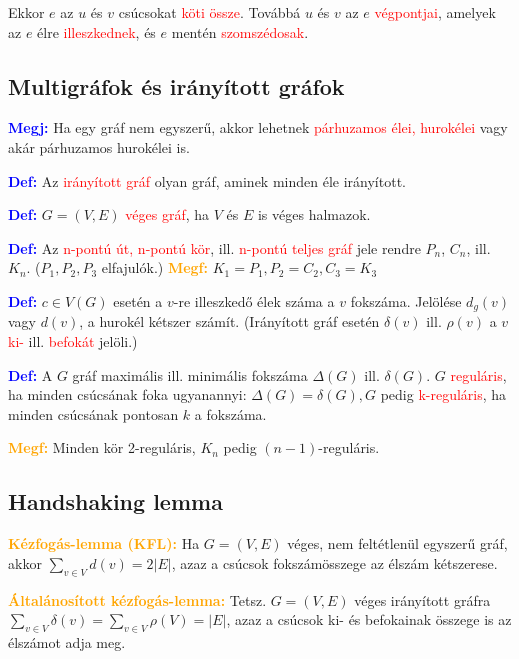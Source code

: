 \documentclass[12pt]{article}
\begin{document}
			Ekkor $e$ az $u$ és $v$ csúcsokat \textcolor{red}{köti össze}. Továbbá $u$ és $v$ az $e$ \textcolor{red}{végpontjai}, amelyek az $e$ élre \textcolor{red}{illeszkednek}, és $e$ mentén \textcolor{red}{szomszédosak}.
		
		\subsection{Multigráfok és irányított gráfok}

			\textcolor{blue}{\textbf{Megj:}} Ha egy gráf nem egyszerű, akkor lehetnek \textcolor{red}{párhuzamos élei, hurokélei} vagy akár párhuzamos hurokélei is.
			
			\textcolor{blue}{\textbf{Def:}} Az \textcolor{red}{irányított gráf} olyan gráf, aminek minden éle irányított.

			\textcolor{blue}{\textbf{Def:}} $G = (V,E)$ \textcolor{red}{véges gráf}, ha $V$ és $E$ is véges halmazok.

			\textcolor{blue}{\textbf{Def:}} Az \textcolor{red}{n-pontú út, n-pontú kör}, ill. \textcolor{red}{n-pontú teljes gráf} jele rendre $P_n$, $C_n$, ill. $K_n$. ($P_1,P_2,P_3$ elfajulók.) \textcolor{orange}{\textbf{Megf:}} $K_1 = P_1, P_2=C_2, C_3=K_3$

			\textcolor{blue}{\textbf{Def:}} $c \in V(G)$ esetén a $v$-re illeszkedő élek száma a $v$ fokszáma. Jelölése $d_g(v)$ vagy $d(v)$, a hurokél kétszer számít. (Irányított gráf esetén $\delta(v)$ ill. $\rho(v)$ a $v$ \textcolor{red}{ki-} ill. \textcolor{red}{befokát} jelöli.)

			\textcolor{blue}{\textbf{Def:}} A $G$ gráf maximális ill. minimális fokszáma $\Delta(G)$ ill. $\delta(G)$. $G$ \textcolor{red}{reguláris}, ha minden csúcsának foka ugyanannyi: $\Delta(G)=\delta(G),G$ pedig \textcolor{red}{k-reguláris}, ha minden csúcsának pontosan $k$ a fokszáma.

			\textcolor{orange}{\textbf{Megf:}} Minden kör 2-reguláris, $K_n$ pedig $(n-1)$-reguláris.

		\subsection{Handshaking lemma}

			\textcolor{orange}{\textbf{Kézfogás-lemma (KFL):}} Ha $G = (V,E)$ véges, nem feltétlenül egyszerű gráf, akkor $\sum_{v \in V} d(v)=2|E|$, azaz a csúcsok fokszámösszege az élszám kétszerese.
		
			\textcolor{orange}{\textbf{Általánosított kézfogás-lemma:}} Tetsz. $G = (V,E)$ véges irányított gráfra $\sum_{v \in V} \delta (v) = \sum_{v \in V} \rho (V) = |E|$, azaz a csúcsok ki- és befokainak összege is az élszámot adja meg. 
\end{document}
